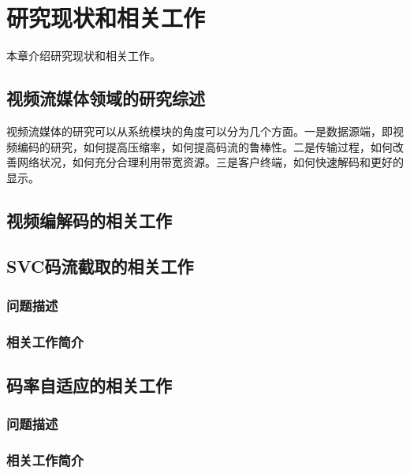 \chapter{研究现状和相关工作}
本章介绍研究现状和相关工作。

\section{视频流媒体领域的研究综述}

视频流媒体的研究可以从系统模块的角度可以分为几个方面。一是数据源端，即视频编码的研究，如何提高压缩率，如何提高码流的鲁棒性。二是传输过程，如何改善网络状况，如何充分合理利用带宽资源。三是客户终端，如何快速解码和更好的显示。

\section{视频编解码的相关工作}

\section{SVC码流截取的相关工作}

\subsection{问题描述}

\subsection{相关工作简介}

\section{码率自适应的相关工作}

\subsection{问题描述}

\subsection{相关工作简介}